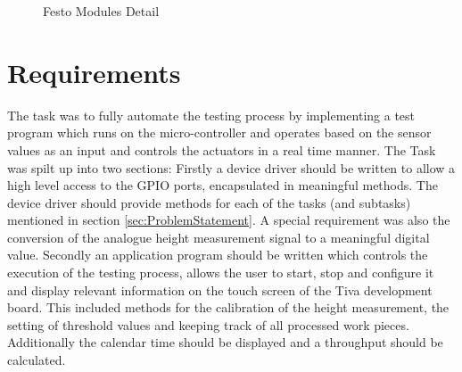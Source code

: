 \begin{figure} [H] 	
	\begin{center}
		\hspace{0.05\textwidth}
		\hspace{0.05\textwidth}
		\caption{Festo Modules Detail}
		\label{fig:festomodulesdetail}
	\end{center}
\end{figure} 

\section{Requirements}
The task was to fully automate the testing process by implementing a test program which runs on the micro-controller and operates based on the sensor values as an input and controls the actuators in a real time manner. The Task was spilt up into two sections:
Firstly a device driver should be written to allow a high level access to the GPIO ports, encapsulated in meaningful methods. The device driver should provide methods for each of the tasks (and subtasks) mentioned in section \ref{sec:ProblemStatement}. A special requirement was also the conversion of the analogue height measurement signal to a meaningful digital value.
Secondly an application program should be written which controls the execution of the testing process, allows the user to start, stop and configure it and display relevant information on the touch screen of the Tiva development board. This included methods for the calibration of the height measurement, the setting of threshold values and keeping track of all processed work pieces. Additionally the calendar time should be displayed and a throughput should be calculated.

